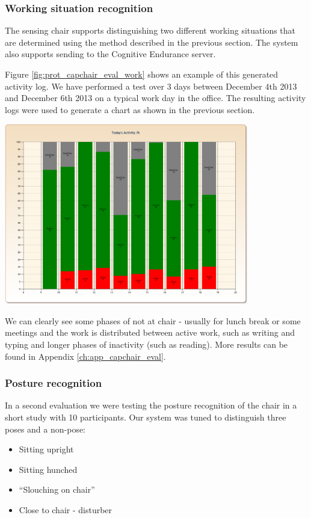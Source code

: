 \subsubsection*{Working situation recognition}
The sensing chair supports distinguishing two different working situations that are determined using the method described in the previous section. The system also supports sending to the Cognitive Endurance server.
 
Figure \ref{fig:prot_capchair_eval_work} shows an example of this generated activity log. We have performed a test over 3 days between December 4th 2013 and December 6th 2013 on a typical work day in the office. The resulting activity logs were used to generate a chart as shown in the previous section. 

\begin{minipage}{\linewidth}
\centering
\includegraphics[width=0.8\textwidth]{images/prot_capchair_eval_work}
\label{fig:prot_capchair_eval_work}
\end{minipage}	

We can clearly see some phases of not at chair - usually for lunch break or some meetings and the work is distributed between active work, such as writing and typing and longer phases of inactivity (such as reading). More results can be found in Appendix \ref{ch:app_capchair_eval}.

\subsubsection*{Posture recognition}
In a second evaluation we were testing the posture recognition of the chair in a short study with 10 participants. Our system was tuned to distinguish three poses and a non-pose:
\begin{itemize}
\item Sitting upright
\item Sitting hunched
\item “Slouching on chair”
\item Close to chair - disturber
\end{itemize}

